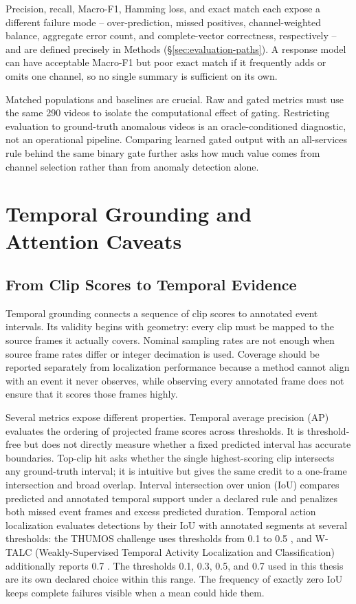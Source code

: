 Precision, recall, Macro-F1, Hamming loss, and exact match each expose a
different failure mode -- over-prediction, missed positives, channel-weighted
balance, aggregate error count, and complete-vector correctness, respectively
\cite{sokolova2009systematic} -- and are defined precisely in Methods
(\S\ref{sec:evaluation-paths}). A response model can have acceptable Macro-F1
but poor exact match if it frequently adds or omits one channel, so no single
summary is sufficient on its own.

Matched populations and baselines are crucial. Raw and gated metrics must use the
same 290 videos to isolate the computational effect of gating. Restricting
evaluation to ground-truth anomalous videos is an oracle-conditioned diagnostic,
not an operational pipeline. Comparing learned gated output with an
all-services rule behind the same binary gate further asks how much value comes
from channel selection rather than from anomaly detection alone.

\section{Temporal Grounding and Attention Caveats}
\label{sec:background-temporal}

\subsection{From Clip Scores to Temporal Evidence}

Temporal grounding connects a sequence of clip scores to annotated event
intervals. Its validity begins with geometry: every clip must be mapped to the
source frames it actually covers. Nominal sampling rates are not enough when
source frame rates differ or integer decimation is used. Coverage should be
reported separately from localization performance because a method cannot align
with an event it never observes, while observing every annotated frame does not
ensure that it scores those frames highly.

Several metrics expose different properties. Temporal average precision (AP)
evaluates the ordering of projected frame scores across thresholds. It is
threshold-free but does not directly measure whether a fixed predicted interval
has accurate boundaries. Top-clip hit asks whether the single highest-scoring
clip intersects any ground-truth interval; it is intuitive but gives the same
credit to a one-frame intersection and broad overlap. Interval intersection over
union (IoU) compares predicted and annotated temporal support under a declared
rule and penalizes both missed event frames and excess predicted duration.
Temporal action localization evaluates detections by their IoU with annotated
segments at several thresholds: the THUMOS challenge uses thresholds from 0.1
to 0.5 \cite{idrees2017thumos}, and W-TALC (Weakly-Supervised Temporal Activity
Localization and Classification) additionally reports 0.7
\cite{paul2018wtalc}. The thresholds 0.1, 0.3, 0.5, and 0.7 used in this thesis
are its own declared choice within this range. The frequency of exactly zero IoU keeps complete failures visible when a mean could
hide them.

